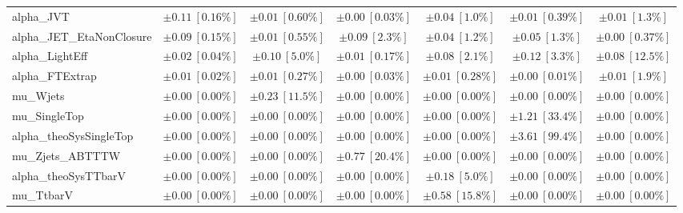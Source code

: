 \begin{sidewaystable}
\begin{center}
\begin{tabular*}{\textwidth}{@{\extracolsep{\fill}}lcccccc}
alpha\_JVT         & $\pm 0.11\ [0.16\%] $          & $\pm 0.01\ [0.60\%] $          & $\pm 0.00\ [0.03\%] $          & $\pm 0.04\ [1.0\%] $          & $\pm 0.01\ [0.39\%] $          & $\pm 0.01\ [1.3\%] $       \\
alpha\_JET\_EtaNonClosure         & $\pm 0.09\ [0.15\%] $          & $\pm 0.01\ [0.55\%] $          & $\pm 0.09\ [2.3\%] $          & $\pm 0.04\ [1.2\%] $          & $\pm 0.05\ [1.3\%] $          & $\pm 0.00\ [0.37\%] $       \\
alpha\_LightEff         & $\pm 0.02\ [0.04\%] $          & $\pm 0.10\ [5.0\%] $          & $\pm 0.01\ [0.17\%] $          & $\pm 0.08\ [2.1\%] $          & $\pm 0.12\ [3.3\%] $          & $\pm 0.08\ [12.5\%] $       \\
alpha\_FTExtrap         & $\pm 0.01\ [0.02\%] $          & $\pm 0.01\ [0.27\%] $          & $\pm 0.00\ [0.03\%] $          & $\pm 0.01\ [0.28\%] $          & $\pm 0.00\ [0.01\%] $          & $\pm 0.01\ [1.9\%] $       \\
mu\_Wjets         & $\pm 0.00\ [0.00\%] $          & $\pm 0.23\ [11.5\%] $          & $\pm 0.00\ [0.00\%] $          & $\pm 0.00\ [0.00\%] $          & $\pm 0.00\ [0.00\%] $          & $\pm 0.00\ [0.00\%] $       \\
mu\_SingleTop         & $\pm 0.00\ [0.00\%] $          & $\pm 0.00\ [0.00\%] $          & $\pm 0.00\ [0.00\%] $          & $\pm 0.00\ [0.00\%] $          & $\pm 1.21\ [33.4\%] $          & $\pm 0.00\ [0.00\%] $       \\
alpha\_theoSysSingleTop         & $\pm 0.00\ [0.00\%] $          & $\pm 0.00\ [0.00\%] $          & $\pm 0.00\ [0.00\%] $          & $\pm 0.00\ [0.00\%] $          & $\pm 3.61\ [99.4\%] $          & $\pm 0.00\ [0.00\%] $       \\
mu\_Zjets\_ABTTTW         & $\pm 0.00\ [0.00\%] $          & $\pm 0.00\ [0.00\%] $          & $\pm 0.77\ [20.4\%] $          & $\pm 0.00\ [0.00\%] $          & $\pm 0.00\ [0.00\%] $          & $\pm 0.00\ [0.00\%] $       \\
alpha\_theoSysTTbarV         & $\pm 0.00\ [0.00\%] $          & $\pm 0.00\ [0.00\%] $          & $\pm 0.00\ [0.00\%] $          & $\pm 0.18\ [5.0\%] $          & $\pm 0.00\ [0.00\%] $          & $\pm 0.00\ [0.00\%] $       \\
mu\_TtbarV         & $\pm 0.00\ [0.00\%] $          & $\pm 0.00\ [0.00\%] $          & $\pm 0.00\ [0.00\%] $          & $\pm 0.58\ [15.8\%] $          & $\pm 0.00\ [0.00\%] $          & $\pm 0.00\ [0.00\%] $       \\

\end{tabular*}
\end{center}
\end{sidewaystable}
